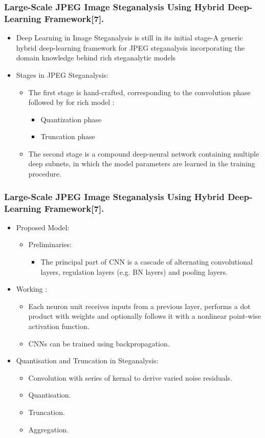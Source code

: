 \documentclass{beamer} %
\theoremstyle{definition} %
\begin{document}
\begin{frame}
\frametitle{Large-Scale JPEG Image Steganalysis Using Hybrid Deep-Learning Framework[7].}
\begin{itemize}
	\item Deep Learning in Image Steganalysis is still in its initial stage-A generic hybrid deep-learning framework for JPEG steganalysis incorporating the domain knowledge behind rich steganalytic models
	\item Stages in JPEG Steganalysis:
	\begin{itemize}
		\item The first stage is hand-crafted, corresponding to the convolution phase followed by for rich model : 
		\begin{itemize}
            \item 	Quantization phase  
            \item   Truncation phase 
		\end{itemize}
	    \item The second stage is a compound deep-neural network containing multiple deep subnets, in which the model parameters are learned in
		the training procedure.
	\end{itemize}
\end{itemize}
\end{frame}
\begin{frame}
\frametitle{Large-Scale JPEG Image Steganalysis Using Hybrid Deep-Learning Framework[7].}
\begin{itemize}
		\item Proposed Model:
	\begin{itemize}
		\item{Preliminaries: }
		\begin{itemize}
			\item 	The principal part of CNN is a cascade of alternating convolutional layers, regulation layers (e.g. BN layers) and pooling layers.
		\end{itemize}
\end{itemize}
\item Working : 
\begin{itemize}
	\item Each neuron unit receives inputs from a previous layer, performs a dot product with weights and optionally follows it with a nonlinear point-wise activation function. 
	\item CNNs can be trained using
	backpropagation. 
\end{itemize}
\item Quantisation and Truncation in Steganalysis:
\begin{itemize}
	\item Convolution with series of kernal to derive varied noise residuals.
	\item Quantisation.
	\item Truncation.
	\item Aggregation.
\end{itemize}
\end{itemize}
\end{frame}
\end{document}
